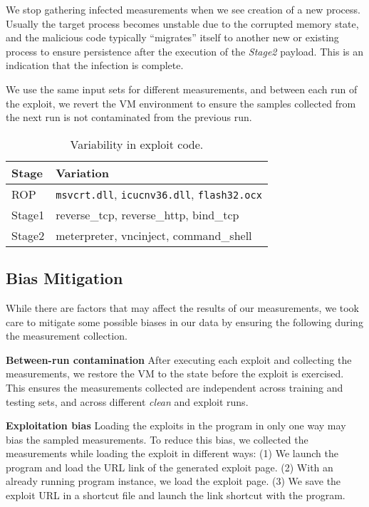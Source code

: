 \documentclass{acm_proc_article-sp}
\begin{document}
We stop gathering infected measurements when we see creation of a
new process. Usually the target process becomes unstable due to the
corrupted memory state, and the malicious code typically ``migrates''
itself to another new or existing process to ensure persistence
after the execution of the \textit{Stage2} payload. This is an 
indication that the infection is complete.

We use the same input sets for different measurements, and between
each run of the exploit, we revert the VM environment to ensure the
samples collected from the next run is not contaminated from the
previous run.

\begin{table}
\centering
\footnotesize
\begin{tabular}{|l|l|} \hline
\textbf{Stage} & \textbf{Variation} \\ \hline \hline
ROP & \texttt{msvcrt.dll}, \texttt{icucnv36.dll}, \texttt{flash32.ocx} \\ \hline
Stage1 & reverse\_tcp, reverse\_http, bind\_tcp \\ \hline
Stage2 & meterpreter, vncinject, command\_shell \\ \hline
\end{tabular}
\caption{Variability in exploit code.}
\label{tbl:malcode_variability}
\end{table}


\subsection{Bias Mitigation}

While there are factors that may affect the results of our measurements,
we took care to mitigate some possible biases in our data by ensuring
the following during the measurement collection.

\textbf{Between-run contamination} \space\space After executing
each exploit and collecting the measurements, we restore the VM to
the state before the exploit is exercised. This ensures the
measurements collected are independent across training and testing
sets, and across different \textit{clean} and exploit runs.

\textbf{Exploitation bias} \space\space Loading the exploits in the
program in only one way may bias the sampled measurements. To reduce
this bias, we collected the measurements while loading the exploit
in different ways: (1) We launch the program and load the URL link of the
generated exploit page. (2) With an already running program instance,
we load the exploit page.  (3) We save the exploit URL in a shortcut
file and launch the link shortcut with the program.
\end{document}

